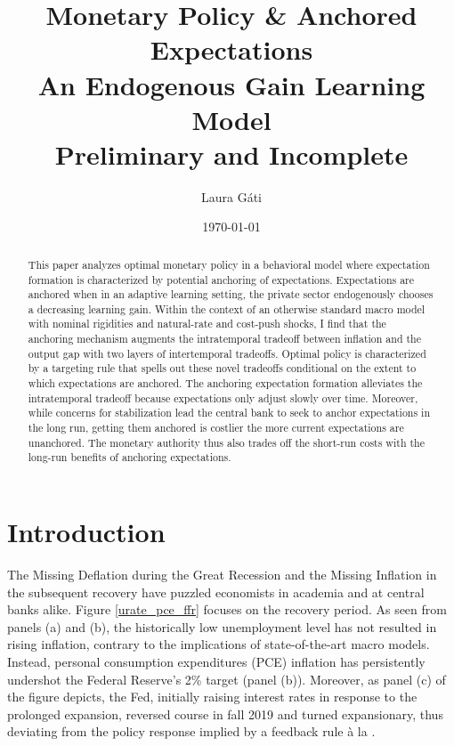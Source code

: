 \documentclass[11pt]{article}
\renewcommand{\[}{\begin{equation}}
\renewcommand{\]}{\end{equation}}
\begin{document}
\title{Monetary Policy \& Anchored Expectations \\
An Endogenous Gain Learning Model \\
\vspace{0.8cm}
\small{Preliminary and Incomplete}}
\author{Laura G\'ati} 
\date{\today}
\maketitle


\begin{abstract}
This paper analyzes optimal monetary policy in a behavioral model where expectation formation is characterized by potential anchoring of expectations. Expectations are anchored when in an adaptive learning setting, the private sector endogenously chooses a decreasing learning gain. Within the context of an otherwise standard macro model with nominal rigidities and natural-rate and cost-push shocks, I find that the anchoring mechanism augments the intratemporal tradeoff between inflation and the output gap with two layers of intertemporal tradeoffs. Optimal policy is characterized by a targeting rule that spells out these novel tradeoffs conditional on the extent to which expectations are anchored. The anchoring expectation formation alleviates the intratemporal tradeoff because expectations only adjust slowly over time. Moreover, while concerns for stabilization lead the central bank to seek to anchor expectations in the long run, getting them anchored is costlier the more current expectations are unanchored. The monetary authority thus also trades off the short-run costs with the long-run benefits of anchoring expectations.
\end{abstract}





\newpage
\section{Introduction}\label{introduction}

The Missing Deflation during the Great Recession and the Missing Inflation in the subsequent recovery have puzzled economists in academia and at central banks alike. Figure \ref{urate_pce_ffr} focuses on the recovery period. As seen from panels (a) and (b), the historically low unemployment level has not resulted in rising inflation, contrary to the implications of state-of-the-art macro models. Instead, personal consumption expenditures (PCE)  inflation has persistently undershot the Federal Reserve's 2\% target (panel (b)).  Moreover, as panel (c) of the figure depicts, the Fed, initially raising interest rates in response to the prolonged expansion, reversed course in fall 2019 and turned expansionary, thus deviating from the policy response implied by a feedback rule \`a la \cite{taylor1993discretion}.
\end{document}
